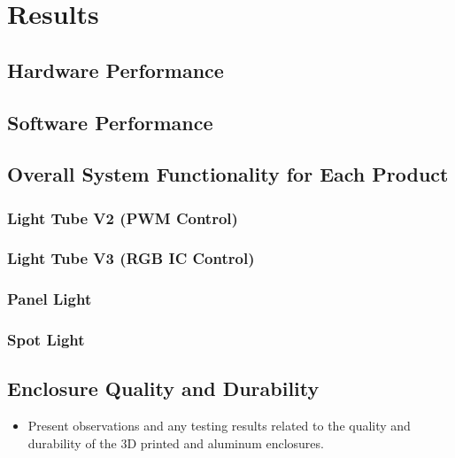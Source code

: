 \section{Results}
\label{sec:results}
\subsection{Hardware Performance}
\subsection{Software Performance}
\subsection{Overall System Functionality for Each Product}
\subsubsection{Light Tube V2 (PWM Control)}
\subsubsection{Light Tube V3 (RGB IC Control)}
\subsubsection{Panel Light}
\subsubsection{Spot Light}
\subsection{Enclosure Quality and Durability}
\label{subsec:enclosure_quality}
\begin{itemize}
	\item Present observations and any testing results related to the quality and durability of the 3D printed and aluminum enclosures.
\end{itemize}